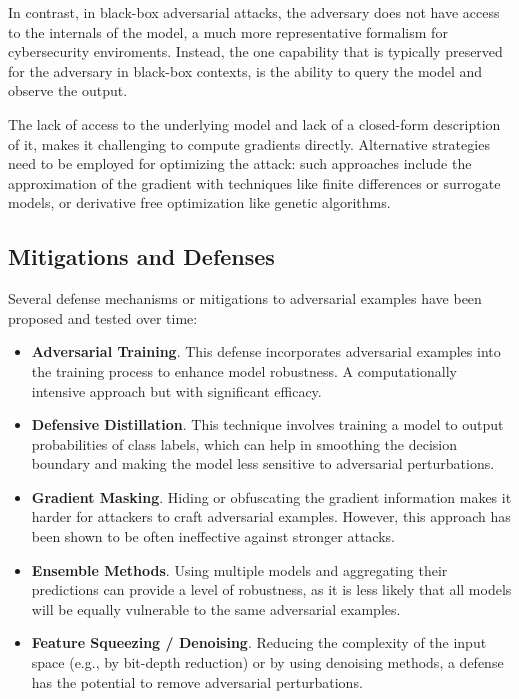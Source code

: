 In contrast, in black-box adversarial attacks, the adversary does not have access to the internals of the model, a much more representative formalism for cybersecurity enviroments.
Instead, the one capability that is typically preserved for the adversary in black-box contexts, is the ability to query the model and observe the output.

The lack of access to the underlying model and lack of a closed-form description of it, makes it challenging to compute gradients directly.
Alternative strategies need to be employed for optimizing the attack: such approaches include the approximation of the gradient with techniques like finite differences or surrogate models, or derivative free optimization like genetic algorithms.

\subsection{Mitigations and Defenses}

Several defense mechanisms or mitigations to adversarial examples have been proposed and tested over time:

\begin{itemize}
    \item \textbf{Adversarial Training}. This defense incorporates adversarial examples into the training process to enhance model robustness. A computationally intensive approach but with significant efficacy.
    \item \textbf{Defensive Distillation}. This technique involves training a model to output probabilities of class labels, which can help in smoothing the decision boundary and making the model less sensitive to adversarial perturbations.
    \item \textbf{Gradient Masking}. Hiding or obfuscating the gradient information makes it harder for attackers to craft adversarial examples. However, this approach has been shown to be often ineffective against stronger attacks.
    \item \textbf{Ensemble Methods}. Using multiple models and aggregating their predictions can provide a level of robustness, as it is less likely that all models will be equally vulnerable to the same adversarial examples.
    \item \textbf{Feature Squeezing / Denoising}. Reducing the complexity of the input space (e.g., by bit-depth reduction) or by using denoising methods, a defense has the potential to remove adversarial perturbations.
\end{itemize}

